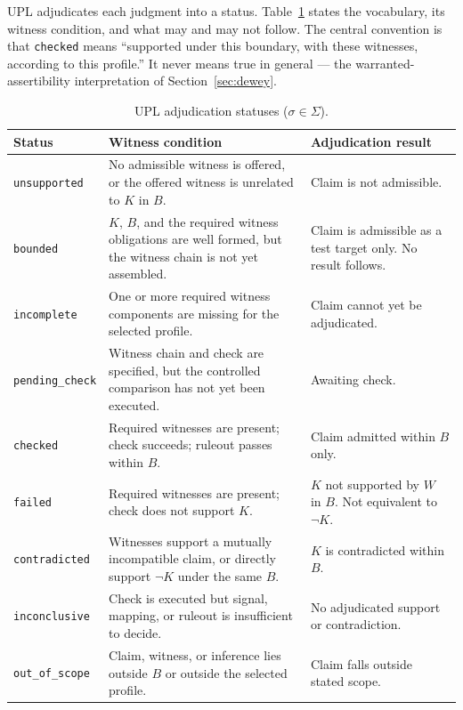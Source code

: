 \documentclass[11pt, a4paper]{article}
\theoremstyle{upldef}
\newcommand{\statuslabel}[1]{\texttt{\small #1}}
\begin{document}
UPL adjudicates each judgment into a status. Table~\ref{tab:logic}
states the vocabulary, its witness condition, and what may and may
not follow. The central convention is that \statuslabel{checked}
means ``supported under this boundary, with these witnesses, according
to this profile.'' It never means true in general --- the
warranted-assertibility interpretation of Section~\ref{sec:dewey}.

\renewcommand{\arraystretch}{1.3}
\begin{table}[t]
\centering
\caption{UPL adjudication statuses ($\sigma \in \Sigma$).}
\label{tab:logic}
\small
\begin{tabularx}{\textwidth}{l X X}
\toprule
\textbf{Status} & \textbf{Witness condition} & \textbf{Adjudication result} \\
\midrule
\statuslabel{unsupported} & No admissible witness is offered, or the offered witness is unrelated to $K$ in $B$. & Claim is not admissible. \\
\statuslabel{bounded} & $K$, $B$, and the required witness obligations are well formed, but the witness chain is not yet assembled. & Claim is admissible as a test target only. No result follows. \\
\statuslabel{incomplete} & One or more required witness components are missing for the selected profile. & Claim cannot yet be adjudicated. \\
\statuslabel{pending\_check} & Witness chain and check are specified, but the controlled comparison has not yet been executed. & Awaiting check. \\
\statuslabel{checked} & Required witnesses are present; check succeeds; ruleout passes within $B$. & Claim admitted within $B$ only. \\
\statuslabel{failed} & Required witnesses are present; check does not support $K$. & $K$ not supported by $W$ in $B$. Not equivalent to $\neg K$. \\
\statuslabel{contradicted} & Witnesses support a mutually incompatible claim, or directly support $\neg K$ under the same $B$. & $K$ is contradicted within $B$. \\
\statuslabel{inconclusive} & Check is executed but signal, mapping, or ruleout is insufficient to decide. & No adjudicated support or contradiction. \\
\statuslabel{out\_of\_scope} & Claim, witness, or inference lies outside $B$ or outside the selected profile. & Claim falls outside stated scope. \\
\bottomrule
\end{tabularx}
\end{table}
\end{document}
